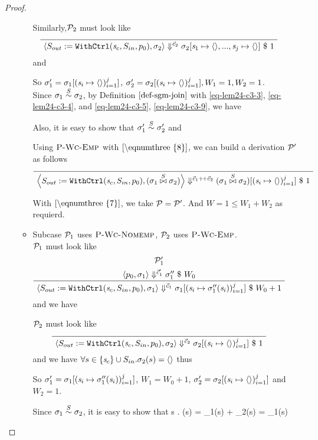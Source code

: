\begin{proof}
\begin{itemize}
\begin{itemize}
    	Similarly,$\mathcal{P}_2$ must look like  	
    	$$\PT{
    		\Axiom{\seval{\casethree}{\sgm_2}{\c_2}{\sgm_2[\s_1 \|-> \emptyv, ..., \s_j \|-> \emptyv]}{1}}
    	}$$
    	and 
    	
 \def\sgmbe#1{\sgm_#1[\j{\s_i \|-> \emptyv}]}
    	
    	So $\sgm_1' = \sgmbe{1}$, $\sgm_2' = \sgmbe{2}, W_1 = 1, W_2 =1 $. \\
    	
 	Since $\sigma_1 \stackrel{S}{\sim} \sigma_2$, by Definition $\ref{def-sgm-join}$ with \eqref{eq-lem24-c3-3}, \eqref{eq-lem24-c3-4}, and  \eqref{eq-lem24-c3-5}, \eqref{eq-lem24-c3-9}, we have    		
   		
   		Also, it is easy to show that $\sigma'_1 \stackrel{S}{\sim} \sigma'_2$ and 
   	
    Using $\textsc{P-Wc-Emp}$ with $\eqref{\eqnumthree{8}}$, we can build a derivation $\mathcal{P}'$ as follows
   		$$\PT{
   			\Axiom{\seval{\casethree}{\sgmx}{\cc}{\sgmx[\j{\s_i \|-> \emptyv}]}{1}}
   		}$$
   	
   	With $\eqref{\eqnumthree{7}}$, we take $\mathcal{P} = \mathcal{P}'$.
   	And $W = 1 \le W_1 + W_2$ as requierd.
   
\item Subcase $\mathcal{P}_1$ uses  $\textsc{P-Wc-Nomemp}$, $\mathcal{P}_2$ uses $\textsc{P-Wc-Emp}$. \\

  \def\sgmbpp#1{\sgm_{#1}[\j{\s_i \|-> \sgm_{#1}''(\s_i)}]}   	
   	$\mathcal{P}_1$ must look like
   	$$\PT{
   			\UCN{\MP_1'}{\seval{p_0}{\sgm_1}{\c_1'}{\sgm_1''}{W_0}}
   			\UC{\seval{\casethree}{\sgm_1}{\c_1}{\sgmbpp1}{W_0+1}}
   	}$$
    and we have 
   	
   	$\mathcal{P}_2$ must look like	
   	$$\PT{
   		\Axiom{\seval{\casethree}{\sgm_2}{\c_2}{\sgmbe{2}}{1}}
   	}$$
   	and we have  
   	$\forall s \in \{\mathit{s}_c\} \cup S_{in}. \sigma_2(s) = \langle \rangle$
   thus
 	
	So $\sgm_1' = \sgmbpp{1}$, $W_1 = W_0 +1$, $\sgm_2' = \sgmbe{2}$ and $W_2 = 1$.
	
	Since $\sigma_1 \stackrel{S}{\sim} \sigma_2$, it is easy to show that 
	 { \forall s \in \Sin. \sgmx(s) = \sgm_1(s) {\++} \sgm_2(s) = \sgm_1(s)}
	

\end{itemize}
\end{itemize}
\end{proof}
